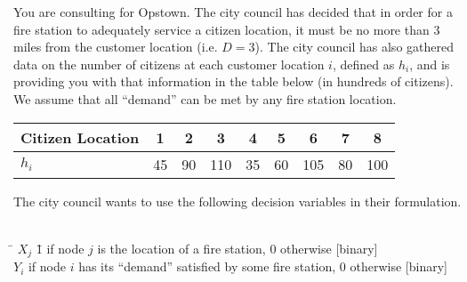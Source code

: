 \documentclass[10pt]{article}
\begin{document}
You are consulting for Opstown.  The city council has decided that in order for a fire station to adequately service a citizen location, it must be no more than 3 miles from the customer location (i.e. $D=3$).  The city council has also gathered data on the number of citizens at each customer location $i$, defined as $h_i$, and is providing you with that information in the table below (in hundreds of citizens).  We assume that all ``demand'' can be met by any fire station location.

\vspace{0.25cm}

\begin{tabular}{l|c|c|c|c|c|c|c|c|}
Citizen Location &  1	&	2	&	3	&	4	&
5	&	6	&	7	&	8	
\\
\hline
$h_i$ & 45	&	90	&	110	&	35	&	60	&	105	&	80	&	100	
\end{tabular}

\vspace{.5cm}

\noindent The city council wants to use the following decision variables in their formulation.
\begin{tabbing}
\\[0.2cm]
\hspace*{.5cm} \= $X_j$ \hspace{1cm} \= 1 if node $j$ is the location of a fire station, 0 otherwise  [binary] \\
\> $Y_{i}$  if node $i$ has its ``demand'' satisfied by some fire station, 0 otherwise  [binary] \\ 
\end{tabbing}
\end{document}

